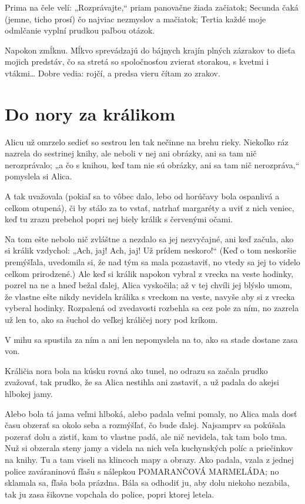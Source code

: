 \documentclass[12pt]{article}
\begin{document}
\begin{Parallel}[p]{}{}
{Prima na čele velí: „Rozprávajte,“
priam panovačne žiada začiatok;
Secunda čaká (jemne, ticho prosí)
čo najviac nezmyslov a mačiatok;
Tertia každé moje odmlčanie
vyplní prudkou paľbou otázok.

Napokon zmĺknu. Mĺkvo sprevádzajú
do bájnych krajín plných zázrakov
to dieťa mojich predstáv, čo sa stretá
so spoločnosťou zvierat storakou,
s kvetmi i vtákmi… Dobre vedia: rojčí,
a predsa vieru čítam zo zrakov.


\section{Do nory za králikom}
Alicu už omrzelo sedieť so sestrou len tak nečinne na brehu rieky. Niekoľko ráz nazrela do sestrinej knihy, ale neboli v nej ani obrázky, ani sa tam nič nerozprávalo; „a čo s knihou, keď tam nie sú obrázky, ani sa tam nič nerozpráva,“ pomyslela si Alica.

A tak uvažovala (pokiaľ sa to vôbec dalo, lebo od horúčavy bola ospanlivá a celkom otupená), či by stálo za to vstať, natrhať margaréty a uviť z nich veniec, keď tu zrazu prebehol popri nej biely králik s červenými očami.

Na tom ešte nebolo nič zvláštne a nezdalo sa jej nezvyčajné, ani keď začula, ako si králik vzdychol: „Ach, jaj! Ach, jaj! Už prídem neskoro!“ (Keď o tom neskoršie premýšľala, uvedomila si, že nad tým sa mala pozastaviť, no vtedy sa jej to videlo celkom prirodzené.) Ale keď si králik napokon vybral z vrecka na veste hodinky, pozrel na ne a hneď bežal ďalej, Alica vyskočila; až v tej chvíli jej blýslo umom, že vlastne ešte nikdy nevidela králika s vreckom na veste, navyše aby si z vrecka vyberal hodinky. Rozpalená od zvedavosti rozbehla sa cez pole za ním, no zazrela už len to, ako sa šuchol do veľkej králičej nory pod kríkom.

V mihu sa spustila za ním a ani len nepomyslela na to, ako sa stade dostane zasa von.

Králičia nora bola na kúsku rovná ako tunel, no odrazu sa začala prudko zvažovať, tak prudko, že sa Alica nestihla ani zastaviť, a už padala do akejsi hlbokej jamy.

Alebo bola tá jama veľmi hlboká, alebo padala veľmi pomaly, no Alica mala dosť času obzerať sa okolo seba a rozmýšľať, čo bude ďalej. Najsamprv sa pokúšala pozerať dolu a zistiť, kam to vlastne padá, ale nič nevidela, tak tam bolo tma. Nuž si obzerala steny jamy a videla na nich veľa kuchynských políc a priečinkov na knihy. Tu a tam viseli na klincoch mapy a obrazy. Ako padala, vzala z jednej police zaváraninovú fľašu s nálepkou POMARANČOVÁ MARMELÁDA; no sklamala sa, fľaša bola prázdna. Bála sa odhodiť ju, aby dolu niekoho nezabila, tak ju zasa šikovne vopchala do police, popri ktorej letela.

}
\end{Parallel}
\end{document}
